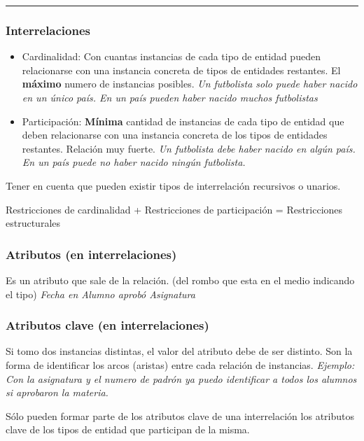 \noindent\rule{\textwidth}{0.5pt}


\subsubsection*{Interrelaciones}

\begin{itemize}
\item Cardinalidad: Con cuantas instancias de cada tipo de entidad pueden relacionarse con una instancia concreta de tipos de entidades restantes. El \textbf{máximo} numero de instancias posibles. \textit{Un futbolista solo puede haber nacido en un único país. En un país pueden haber nacido muchos futbolistas}
\end{itemize}

\begin{itemize}
\item Participación: \textbf{Mínima} cantidad de instancias de cada tipo de entidad que deben relacionarse con una instancia concreta de los tipos de entidades restantes. Relación muy fuerte. \textit{Un futbolista debe haber nacido en algún país. En un país puede no haber nacido ningún futbolista.}
\end{itemize}

Tener en cuenta que pueden existir tipos de interrelación recursivos o unarios.

\smallskip

Restricciones de cardinalidad + Restricciones de participación = Restricciones estructurales



\subsubsection*{Atributos (en interrelaciones)}
Es un atributo que sale de la relación. (del rombo que esta en el medio indicando el tipo) \textit{Fecha en Alumno aprobó Asignatura}

\subsubsection*{Atributos clave (en interrelaciones)}
Si tomo dos instancias distintas, el valor del atributo debe de ser distinto. Son la forma de identificar los arcos (aristas) entre cada relación de instancias. 
\textit{Ejemplo: Con la asignatura y el numero de padrón ya puedo identificar a todos los alumnos si aprobaron la materia.}

Sólo pueden formar parte de los atributos clave de una
interrelación los atributos clave de los tipos de entidad que
participan de la misma.


